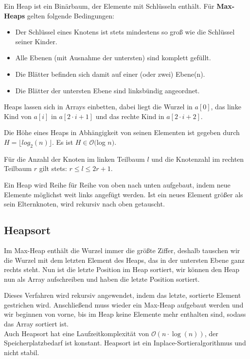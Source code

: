 \documentclass[12pt]{article}
\begin{document}
Ein Heap ist ein Binärbaum, der Elemente mit Schlüsseln enthält. Für \textbf{Max-Heaps} gelten folgende Bedingungen:

\begin{itemize}  
\item Der Schlüssel eines Knotens ist stets mindestens so groß wie die Schlüssel seiner Kinder.
\item Alle Ebenen (mit Ausnahme der untersten) sind komplett gefüllt.
\item Die Blätter befinden sich damit auf einer (oder zwei) Ebene(n).
\item Die Blätter der untersten Ebene sind linksbündig angeordnet.
\end{itemize}

Heaps lassen sich in Arrays einbetten, dabei liegt die Wurzel in $a[0]$, das linke Kind von $a[i]$ in $a[2\cdot{}i+1]$ und das rechte Kind in $a[2\cdot{}i+2]$.

Die Höhe eines Heaps in Abhängigkeit von seinen Elementen ist gegeben durch $H = \lfloor{}log_2(n)\rfloor$. Es ist $H \in \mathcal O($log $n)$.

Für die Anzahl der Knoten im linken Teilbaum $l$ und die Knotenzahl im rechten Teilbaum $r$ gilt stets: $r \leq l \leq 2r + 1$.

Ein Heap wird Reihe für Reihe von oben nach unten aufgebaut, indem neue Elemente möglichst weit links angefügt werden. Ist ein neues Element größer als sein Elternknoten, wird rekursiv nach oben getauscht.

\subsection{Heapsort}

Im Max-Heap enthält die Wurzel immer die größte Ziffer, deshalb tauschen wir die Wurzel mit dem letzten Element des Heaps, das in der untersten Ebene ganz rechts steht. Nun ist die letzte Position im Heap sortiert, wir können den Heap nun als Array aufschreiben und haben die letzte Position sortiert.

Dieses Verfahren wird rekursiv angewendet, indem das letzte, sortierte Element gestrichen wird. Anschließend muss wieder ein Max-Heap aufgebaut werden und wir beginnen von vorne, bis im Heap keine Elemente mehr enthalten sind, sodass das Array sortiert ist.\\

Auch Heapsort hat eine Laufzeitkomplexität von $\mathcal O(n\cdot{}\log(n))$, der Speicherplatzbedarf ist konstant. Heapsort ist ein Inplace-Sortieralgorithmus und nicht stabil.
\end{document}
